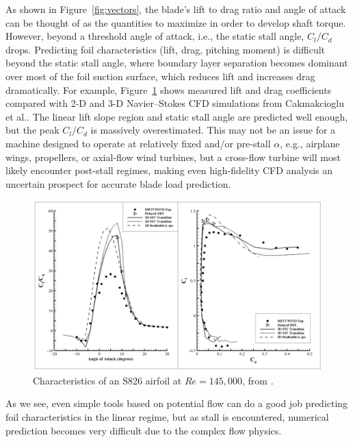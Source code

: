 As shown in Figure~\ref{fig:vectors}, the blade's lift to drag ratio and angle
of attack can be thought of as the quantities to maximize in order to develop
shaft torque. However, beyond a threshold angle of attack, i.e., the static
stall angle, $C_l/C_d$ drops. Predicting foil characteristics (lift, drag,
pitching moment) is difficult beyond the static stall angle, where boundary
layer separation becomes dominant over most of the foil suction surface, which
reduces lift and increases drag dramatically. For example,
Figure~\ref{fig:S826-perf} shows measured lift and drag coefficients compared
with 2-D and 3-D Navier--Stokes CFD simulations from Cakmakcioglu et
al.\cite{Cakmakcioglu2014}. The linear lift slope region and static stall angle
are predicted well enough, but the peak $C_l/C_d$ is massively overestimated.
This may not be an issue for a machine designed to operate at relatively fixed
and/or pre-stall $\alpha$, e.g., airplane wings, propellers, or axial-flow wind
turbines, but a cross-flow turbine will most likely encounter post-stall
regimes, making even high-fidelity CFD analysis an uncertain prospect for
accurate blade load prediction.


\begin{figure}[ht]
    \centering
    
    \includegraphics[width=\textwidth]{figures/cakmak-et-al-2014-fig8}
    
    \caption{Characteristics of an S826 airfoil at $Re=145,000$, from
        \cite{Cakmakcioglu2014}.}
    
    \label{fig:S826-perf}
\end{figure}


 As we see, even simple tools based on
potential flow can do a good job predicting foil characteristics in the linear
regime, but as stall is encountered, numerical prediction becomes very difficult
due to the complex flow physics.


